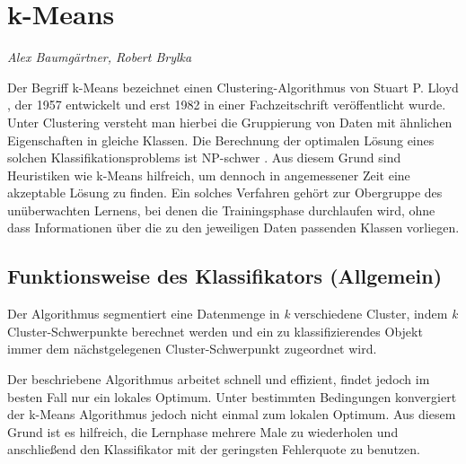\section{k-Means}
\textit{Alex Baumgärtner, Robert Brylka}


Der Begriff k-Means bezeichnet einen Clustering-Algorithmus von Stuart P. Lloyd \cite{Lloyd}, der 1957 entwickelt und erst 1982 in einer Fachzeitschrift veröffentlicht wurde. Unter Clustering versteht man hierbei die Gruppierung von Daten mit ähnlichen Eigenschaften in gleiche Klassen. Die Berechnung der optimalen Lösung eines solchen Klassifikationsproblems ist NP-schwer \cite{kMeansNPhard}. Aus diesem Grund sind Heuristiken wie k-Means hilfreich, um dennoch in angemessener Zeit eine akzeptable Lösung zu finden.
Ein solches Verfahren gehört zur Obergruppe des unüberwachten Lernens, bei denen die Trainingsphase durchlaufen wird, ohne dass Informationen über die zu den jeweiligen Daten passenden Klassen vorliegen.



\subsection{Funktionsweise des Klassifikators (Allgemein)}
Der Algorithmus segmentiert eine Datenmenge in\emph{ k }verschiedene Cluster, indem\emph{ k }Cluster-Schwerpunkte berechnet werden und ein zu klassifizierendes Objekt immer dem nächstgelegenen Cluster-Schwerpunkt zugeordnet wird.

Der beschriebene Algorithmus arbeitet schnell und effizient, findet jedoch im besten Fall nur ein lokales Optimum. Unter bestimmten Bedingungen konvergiert der k-Means Algorithmus jedoch nicht einmal zum lokalen Optimum\cite{kMeansMinimum}. Aus diesem Grund ist es hilfreich, die Lernphase mehrere Male zu wiederholen und anschließend den Klassifikator mit der geringsten Fehlerquote zu benutzen.  


